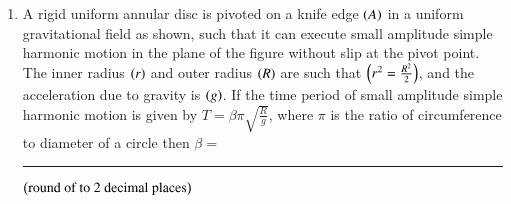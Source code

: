 \documentclass[journal]{IEEEtran}
\begin{document}
\begin{enumerate}
{\begin{figure}[H]
\label{fig:my_label}
\end{figure}
}
\item{
A rigid uniform annular disc is pivoted on a knife edge $\left(A\right)$ in a uniform gravitational field as shown, such that it can execute small amplitude simple harmonic motion in the plane of the figure without slip at the pivot point. The inner radius $\left(r\right)$ and outer radius $\left(R\right)$ are such that $\left(r^2=\frac{R^2}{2}\right)$, and the acceleration due to gravity is $\left(g\right)$. If the time period of small amplitude simple harmonic motion is given by $T = \beta \pi \sqrt{\frac{R}{g}}$, where $\pi$ is the ratio of circumference to diameter of a circle then $\beta=$\rule{2cm}{0.15mm}$\left(\text{round of to $2$ decimal places}\right)$
\begin{figure}[H]
\centering
{}%


\end{figure}}
\end{enumerate}
\end{document}

